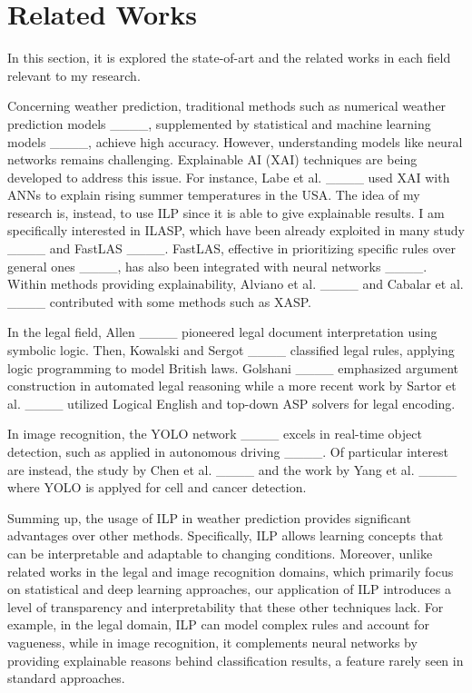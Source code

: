 \section{Related Works}
In this section, it is explored the state-of-art and the related works in each field relevant to my research.

Concerning weather prediction, traditional methods such as numerical weather prediction models ____, supplemented by statistical and machine learning models ____, achieve high accuracy. However, understanding models like neural networks remains challenging. Explainable AI (XAI) techniques are being developed to address this issue. For instance, Labe et al. ____ used XAI with ANNs to explain rising summer temperatures in the USA. The idea of my research is, instead, to use ILP since it is able to give explainable results. I am specifically interested in ILASP, which have been already exploited in many study ____ and FastLAS ____. FastLAS, effective in prioritizing specific rules over general ones ____, has also been integrated with neural networks ____. Within methods providing explainability, Alviano et al. ____ and Cabalar et al. ____ contributed with some methods such as XASP.

In the legal field, Allen ____ pioneered legal document interpretation using symbolic logic. Then, Kowalski and Sergot ____ classified legal rules, applying logic programming to model British laws. Golshani ____ emphasized argument construction in automated legal reasoning while a more recent work by Sartor et al. ____ utilized Logical English and top-down ASP solvers for legal encoding.

In image recognition, the YOLO network ____ excels in real-time object detection, such as applied in autonomous driving ____. Of particular interest are instead, the study by Chen et al. ____ and the work by Yang et al. ____ where YOLO is applyed for cell and cancer detection.

Summing up, the usage of ILP in weather prediction provides significant advantages over other methods. Specifically, ILP allows learning concepts that can be interpretable and adaptable to changing conditions. Moreover, unlike related works in the legal and image recognition domains, which primarily focus on statistical and deep learning approaches, our application of ILP introduces a level of transparency and interpretability that these other techniques lack. For example, in the legal domain, ILP can model complex rules and account for vagueness, while in image recognition, it complements neural networks by providing explainable reasons behind classification results, a feature rarely seen in standard approaches.